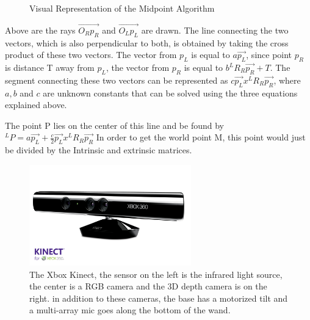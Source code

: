 \documentclass[pdftex,10.5pt]{report}
\begin{document}
\begin{figure}[H]
\centering
	\caption{Visual Representation of the Midpoint Algorithm}
\end{figure}

Above are the rays $\vec{O_{R}p_{R}}$ and $\vec{O_{L}p_{L}}$ are drawn. The line connecting the two vectors, which is also perpendicular to both, is obtained by taking the cross product of these two vectors. The vector from $p_{L}$ is equal to $a\vec{p_{L}}$, since point $p_{R}$ is distance T away from $p_{L}$, the vector from $p_{R}$ is equal to $b^{L}R_{R}\vec{p_{R}}+T$. The segment connecting these two vectors can be represented as $c\vec{p_{L}}x^{L}R_{R}\vec{p_{R}}$, where $a,b$ and $c$ are unknown constants that can be solved using the three equations explained above.

The point P lies on the center of this line and be found by $^{L}P=a\vec{p_{L}}+\frac{c}{2}\vec{p_{L}}x^{L}R_{R}\vec{p_{R}}$ In order to get the world point M, this point would just be divided by the Intrinsic and extrinsic matrices.

\begin{figure}[H]
	\centering
	\includegraphics[width=70mm]{figures/kinect.jpg}
	\caption{The Xbox Kinect, the sensor on the left is the infrared light source, the center is a RGB camera and the 3D 				depth camera is on the right. in addition to these cameras, the base has a motorized tilt and a multi-array mic 				goes along the bottom of the wand.}
	\label{kinectlable}
\end{figure}
\end{document}
